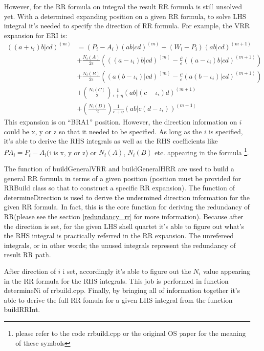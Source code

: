 However, for the RR formula on integral the result RR formula is still unsolved yet.
With a determined expanding position on a given RR formula, to solve LHS integral
it's needed to specify the direction of RR formula. For example, the VRR expansion 
for ERI is:
\begin{equation}
 \begin{split}
((a+\iota_{i})b|cd)^{(m)} &= (P_{i} - A_{i})(ab|cd)^{(m)} +
\left(W_{i} -P_{i}\right)(ab|cd)^{(m+1)} \\
&+\frac{N_{i}(A)}{2\epsilon}\left(((a-\iota_{i})b|cd)^{(m)}-\frac{\rho}{
\epsilon }((a-\iota_{i})b|cd)^{(m+1)}\right)  \\
&+\frac{N_{i}(B)}{2\epsilon}\left((a(b-\iota_{i})|cd)^{(m)}-\frac{\rho}{
\epsilon }(a(b-\iota_{i})|cd)^{(m+1)}\right)  \\
&+\left(\frac{N_{i}(C)}{2}\right)\frac{1}{\epsilon+\eta}
(ab|(c-\iota_{i})d)^{(m+1)} \\
&+\left(\frac{N_{i}(D)}{2}\right)\frac{1}{\epsilon+\eta}
(ab|c(d-\iota_{i}))^{(m+1)}
\end{split}
\end{equation}
This expansion is on ``BRA1'' position. However, the direction information on $i$ 
could be x, y or z so that it needed to be specified. As long as the $i$ is specified,
it's able to derive the RHS integrals as well as the RHS coefficients like 
$PA_{i} = P_{i} - A_{i}$(i is x, y or z) or $N_{i}(A)$, $N_{i}(B)$ etc. appearing in
the formula \footnote{please refer to the code rrbuild.cpp or the original OS paper
\cite{OS1986} for the meaning of these symbols}.

The function of buildGeneralVRR and buildGeneralHRR are used to build a general 
RR formula in terms of a given position (position must be provided for RRBuild
class so that to construct a specific RR expansion). The function of determineDirection
is used to derive the undermined direction information for the given RR formula.
In fact, this is the core function for deriving the redundancy of RR(please see the 
section \ref{redundancy_rr} for more information). Because after
the direction is set, for the given LHS shell quartet it's able to figure out
what's the RHS integral is practically referred in the RR expansion. The unrefereed
integrals, or in other words; the unused integrals represent the redundancy of 
result RR path.

After direction of $i$ i set, accordingly it's able to figure out the $N_{i}$ value
appearing in the RR formula for the RHS integrals. This job is performed in function
determineNi of rrbuild.cpp. Finally, by bringing all of information together it's able
to derive the full RR fomula for a given LHS integral from the function buildRRInt. 

